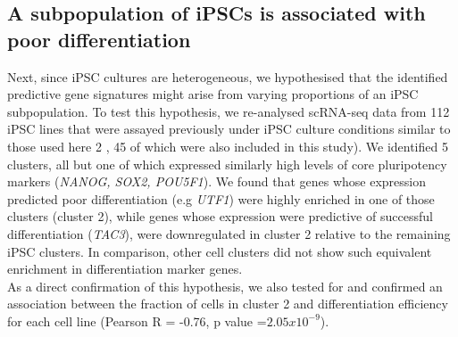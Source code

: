 \subsection{A subpopulation of iPSCs is associated with poor differentiation}

Next, since iPSC cultures are heterogeneous, we hypothesised that the identified predictive gene signatures might arise from varying proportions of an iPSC subpopulation. 
To test this hypothesis, we re-analysed scRNA-seq data from 112 iPSC lines that were assayed previously under iPSC culture conditions similar to those used here 2 
\cite{cuomo2020single}, 45 of which were also included in this study). 
We identified 5 clusters, all but one of which expressed similarly high levels of core pluripotency markers (\textit{NANOG, SOX2, POU5F1}). 
We found that genes whose expression predicted poor differentiation (e.g \textit{UTF1}) were highly enriched in one of those clusters (cluster 2), while genes whose expression were predictive of successful differentiation (\textit{TAC3}), were downregulated in cluster 2 relative to the remaining iPSC clusters. 
In comparison, other cell clusters did not show such equivalent enrichment in differentiation marker genes.\\

As a direct confirmation of this hypothesis, we also tested for and confirmed an association between the fraction of cells in cluster 2 and differentiation efficiency for each cell line (Pearson R = -0.76, p value =$2.05x10^{-9}$). 

